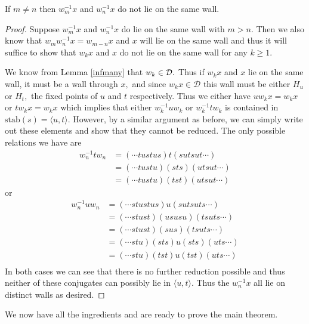 \documentclass[class=book, crop=false,12 pt]{standalone}
\begin{document}
\begin{lemma}If $m\neq n$ then $w^{-1}_mx$ and $w^{-1}_nx$ do not lie on the same wall.\label{samewall}\end{lemma}
\begin{proof}
	Suppose $w^{-1}_mx$ and $w^{-1}_nx$ do lie on the same wall with $m>n.$ Then we also know that $w_mw^{-1}_nx=w_{m-n}x$ and $x$ will lie on the same wall and thus it will suffice to show that $w_kx$ and $x$ do not lie on the same wall for any $k\ge 1.$
	
	We know from Lemma \ref{infmany} that $w_k\in \mathcal{D}.$ Thus if $w_kx$ and $x$ lie on the same wall, it must be a wall through $x,$ and since $w_kx\in \mathcal{D}$ this wall must be either $H_u$ or $H_t,$ the fixed points of $u$ and $t$ respectively. Thus we either have $uw_kx=w_kx$ or $tw_kx=w_kx$ which implies that either $w_k^{-1}uw_k$ or $w_k^{-1}tw_k$ is contained in $\mathrm{stab}(s)=\langle u,t \rangle.$ However, by a similar argument as before, we can simply write out these elements and show that they cannot be reduced. The only possible relations we have are
\begin{align*}
	w_n^{-1}tw_n&=(\cdots tustus)t(sutsut\cdots)\\
		    &=(\cdots tustu)(sts)(utsut\cdots)\\
		    &=(\cdots tustu)(tst)(utsut\cdots)
\end{align*}
or
\begin{align*}
	w_n^{-1}uw_n&=(\cdots stustus)u(sutsuts\cdots)\\
		    &=(\cdots stust)(ususu)(tsuts\cdots)\\
		    &=(\cdots stust)(sus)(tsuts\cdots)\\
		    &=(\cdots stu)(sts)u(sts)(uts\cdots)\\
		    &=(\cdots stu)(tst)u(tst)(uts\cdots)\\
\end{align*}
In both cases we can see that there is no further reduction possible and thus neither of these conjugates can possibly lie in $\langle u,t \rangle.$ Thus the $w^{-1}_nx$ all lie on distinct walls as desired.
\end{proof}

We now have all the ingredients and are ready to prove the main theorem.
\end{document}
